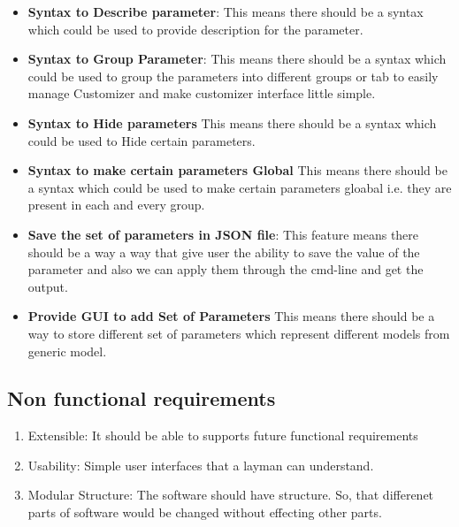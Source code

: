 \begin{itemize}
\begin{enumerate}
	\end{enumerate}
	\item {\bf Syntax to Describe parameter}: 
		This means there should be a syntax which could be used to provide description for the parameter.
	\item \textbf{Syntax to Group Parameter}:
		This means there should be a syntax which could be used to group the parameters into different groups or tab to easily manage Customizer and make customizer interface little simple.
	\item \textbf{Syntax to Hide parameters}
		This means there should be a syntax which could be used to Hide certain parameters.
	\item \textbf{Syntax to make certain parameters Global}
		This means there should be a syntax which could be used to make certain parameters gloabal i.e. they are present in each and every group.
	\item \textbf{Save the set of parameters in JSON file}:
	This feature means there should be a way a way that give user the ability to save the value of the parameter and also we can apply them through the cmd-line and get the output.
	
	\item \textbf{Provide GUI to add Set of Parameters}
		This means there should be a way to store different set of parameters which represent different models from generic model.
	\end{itemize}
\subsection{Non functional requirements}
\begin{enumerate} 
	\item Extensible: It should be able to supports future functional requirements
	\item Usability: Simple user interfaces that a layman can understand.
	\item Modular Structure: The software should have  structure. So, that differenet parts of software would be changed without effecting other parts.
 
\end{enumerate}

